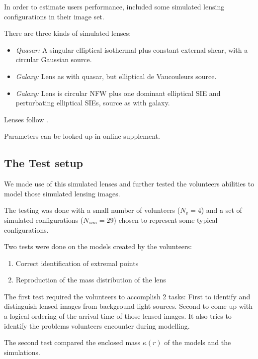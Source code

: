 In order to estimate users performance, \sw included some simulated lensing configurations in their image set.

There are three kinds of simulated lenses:

\begin{itemize}
  \item {\em Quasar:\/} A singular elliptical isothermal plus constant
    external shear, with a circular Gaussian source.
  \item {\em Galaxy:\/} Lens as with quasar, but elliptical de
    Vaucouleurs source.
  \item {\em Galaxy:\/} Lens is circular NFW plus one dominant
    elliptical SIE and perturbating elliptical SIEs, source as with
    galaxy.
\end{itemize}
Lenses follow \cite{2001astro.ph..2341K,2001astro.ph..2340K}.

Parameters can be looked up in online supplement.


\subsection{The Test setup} \label{sec:testsetup}
We made use of this simulated lenses and further tested the volunteers abilities to model those simulated lensing images.

The testing was done with a small number of volunteers ($N_v=4$) and a set of simulated configurations ($N_{sim}=29$) chosen to represent some typical configurations.

Two tests were done on the models created by the volunteers:

\begin{enumerate}
  \item Correct identification of extremal points
  \item Reproduction of the mass distribution of the lens
\end{enumerate}

The first test required the volunteers to accomplish 2 tasks: First to identify and distinguish lensed images from background light sources.
Second to come up with a logical ordering of the arrival time of those lensed images.
It also tries to identify the problems volunteers encounter during modelling.

The second test compared the enclosed mass $\kappa(r)$ of the models and the simulations.
